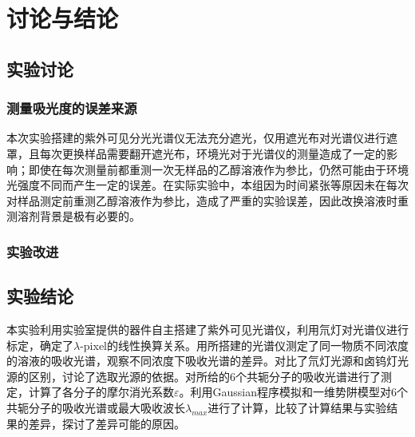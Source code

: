 \documentclass[12pt]{article}
\begin{document}
 	 \section{讨论与结论}
		\subsection{实验讨论}
 			\subsubsection{测量吸光度的误差来源}
本次实验搭建的紫外可见分光光谱仪无法充分遮光，仅用遮光布对光谱仪进行遮罩，且每次更换样品需要翻开遮光布，环境光对于光谱仪的测量造成了一定的影响；即使在每次测量前都重测一次无样品的乙醇溶液作为参比，仍然可能由于环境光强度不同而产生一定的误差。在实际实验中，本组因为时间紧张等原因未在每次对样品测定前重测乙醇溶液作为参比，造成了严重的实验误差，因此改换溶液时重测溶剂背景是极有必要的。\par 

 	 	\subsubsection{实验改进}
 	 \subsection{实验结论}
本实验利用实验室提供的器件自主搭建了紫外可见光谱仪，利用氘灯对光谱仪进行标定，确定了$\lambda$-pixel的线性换算关系。用所搭建的光谱仪测定了同一物质不同浓度的溶液的吸收光谱，观察不同浓度下吸收光谱的差异。对比了氘灯光源和卤钨灯光源的区别，讨论了选取光源的依据。对所给的6个共轭分子的吸收光谱进行了测定，计算了各分子的摩尔消光系数$\varepsilon$。利用Gaussian程序模拟和一维势阱模型对6个共轭分子的吸收光谱或最大吸收波长$\lambda_{max}$进行了计算，比较了计算结果与实验结果的差异，探讨了差异可能的原因。
 
 

   

\vbox{}  



\end{document}
